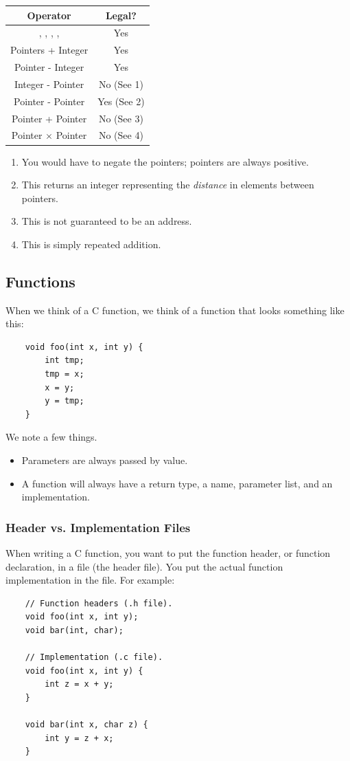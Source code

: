 \documentclass[letterpaper]{article}
\begin{document}
\begin{center}
    \begin{tabular}{|c|c|}
        \hline 
        \textbf{Operator} & \textbf{Legal?} \\
        \hline 
        \code{++}, \code{--}, \code{[]}, \code{==}, \code{!=} & Yes \\ 
        Pointers + Integer & Yes \\ 
        Pointer - Integer & Yes \\ 
        Integer - Pointer & No (See 1) \\ 
        Pointer - Pointer & Yes (See 2) \\ 
        Pointer + Pointer & No (See 3) \\ 
        Pointer $\times$ Pointer & No (See 4) \\ 
        \hline
    \end{tabular}
\end{center}
\begin{enumerate}[(1)]
    \item You would have to negate the pointers; pointers are always positive. 
    \item This returns an integer representing the \emph{distance} in elements between pointers.
    \item This is not guaranteed to be an address. 
    \item This is simply repeated addition.
\end{enumerate}

\subsection{Functions}
When we think of a C function, we think of a function that looks something like this:
\begin{verbatim}
    void foo(int x, int y) {
        int tmp; 
        tmp = x;
        x = y;
        y = tmp;
    }
\end{verbatim}
We note a few things.
\begin{itemize}
    \item Parameters are always passed by value.
    \item A function will always have a return type, a name, parameter list, and an implementation.
\end{itemize}

\subsubsection{Header vs. Implementation Files}
When writing a C function, you want to put the function header, or function declaration, in a  file (the header file). You put the actual function implementation in the  file. For example:
\begin{verbatim}
    // Function headers (.h file). 
    void foo(int x, int y);
    void bar(int, char);

    // Implementation (.c file).
    void foo(int x, int y) {
        int z = x + y;
    }

    void bar(int x, char z) {
        int y = z + x;
    }
\end{verbatim}
\end{document}
